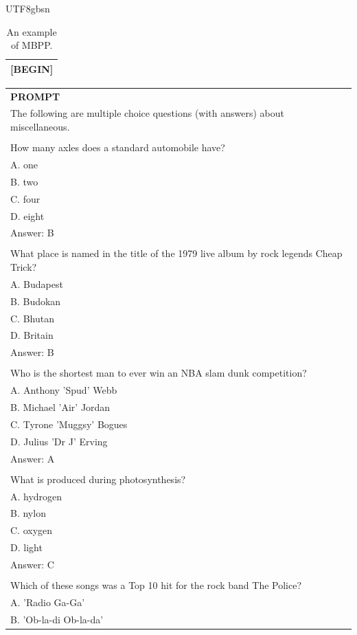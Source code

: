 \documentclass[11pt, a4paper, logo, copyright, nonumbering]{deepseek}
\begin{document}
\begin{CJK*}{UTF8}{gbsn}
\begin{table}[ht]
\begin{tabular}{p{12cm}}
[BEGIN]\\
\bottomrule
\end{tabular}
    \caption{\centering An example of MBPP.}
    \label{tab:mbpp_eval_format_example}
\end{table}

\begin{table}[ht]
    \centering \small
\begin{tabular}{p{12cm}}
\toprule
\textbf{PROMPT}\\

The following are multiple choice questions (with answers) about miscellaneous.\\
\\
How many axles does a standard automobile have?\\
A. one\\
B. two\\
C. four\\
D. eight\\
Answer: B\\
\\
What place is named in the title of the 1979 live album by rock legends Cheap Trick?\\
A. Budapest\\
B. Budokan\\
C. Bhutan\\
D. Britain\\
Answer: B\\
\\
Who is the shortest man to ever win an NBA slam dunk competition?\\
A. Anthony 'Spud' Webb\\
B. Michael 'Air' Jordan\\
C. Tyrone 'Muggsy' Bogues\\
D. Julius 'Dr J' Erving\\
Answer: A\\
\\
What is produced during photosynthesis?\\
A. hydrogen\\
B. nylon\\
C. oxygen\\
D. light\\
Answer: C\\
\\
Which of these songs was a Top 10 hit for the rock band The Police?\\
A. 'Radio Ga-Ga'\\
B. 'Ob-la-di Ob-la-da'\\

\end{tabular}
\end{table}
\end{CJK*}
\end{document}
